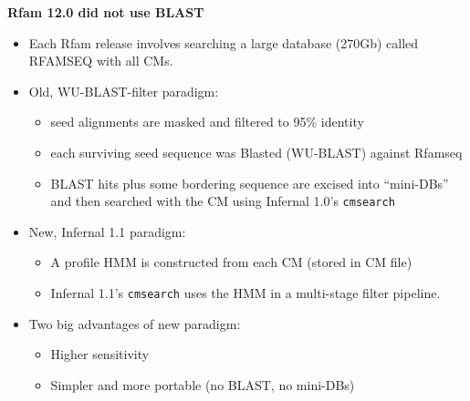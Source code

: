 \documentclass[landscape]{slides}
\begin{document}
\begin{slide}
\begin{center}
\small \textbf{Rfam 12.0 did not use BLAST}
\end{center}
\tiny

\begin{itemize}
\item Each Rfam release involves searching a large database (270Gb) called RFAMSEQ 
with all CMs. 

\item Old, WU-BLAST-filter paradigm:

\begin{itemize}
\item
seed alignments are masked and filtered to 95\% identity
\item
each surviving seed sequence was Blasted (WU-BLAST) against Rfamseq
\item 
BLAST hits plus some bordering sequence are excised into ``mini-DBs''
and then searched with the CM using Infernal 1.0's \texttt{cmsearch}
\end{itemize}

\item New, Infernal 1.1 paradigm:
\begin{itemize}
  \item A profile HMM is constructed from each CM (stored in CM file)
  \item Infernal 1.1's \texttt{cmsearch} uses the HMM in a multi-stage filter pipeline. 
\end{itemize}

\item Two big advantages of new paradigm:
\begin{itemize}
  \item Higher sensitivity
  \item Simpler and more portable (no BLAST, no mini-DBs)
\end{itemize}

\end{itemize}


\vfill
\end{slide}
\end{document}
